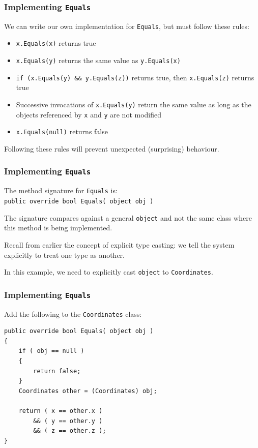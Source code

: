 \begin{frame}
\frametitle{Implementing \texttt{Equals}}
We can write our own implementation for \texttt{Equals}, but must follow these rules:

\begin{itemize}
\item \texttt{x.Equals(x)} returns true
\item \texttt{x.Equals(y)} returns the same value as \texttt{y.Equals(x)}
\item \texttt{if (x.Equals(y) \&\& y.Equals(z))} returns true, then \texttt{x.Equals(z)} returns true
\item Successive invocations of \texttt{x.Equals(y)} return the same value as long as the objects referenced by \texttt{x} and \texttt{y} are not modified
\item \texttt{x.Equals(null)} returns false
\end{itemize}

Following these rules will prevent unexpected (surprising) behaviour.

\end{frame}

\begin{frame}
\frametitle{Implementing \texttt{Equals}}
The method signature for \texttt{Equals} is:\\
\quad \texttt{public override bool Equals( object obj )}

The signature compares against a general \texttt{object} and not the same class where this method is being implemented.

Recall from earlier the concept of explicit type casting: we tell the system explicitly to treat one type as another.

In this example, we need to explicitly cast \texttt{object} to \texttt{Coordinates}.

\end{frame}

\begin{frame}[fragile]
\frametitle{Implementing \texttt{Equals}}
Add the following to the \texttt{Coordinates} class:

\begin{verbatim}
public override bool Equals( object obj )
{
    if ( obj == null )
    {
        return false;
    }
    Coordinates other = (Coordinates) obj;
    
    return ( x == other.x ) 
        && ( y == other.y ) 
        && ( z == other.z );
}
\end{verbatim}

\end{frame}

